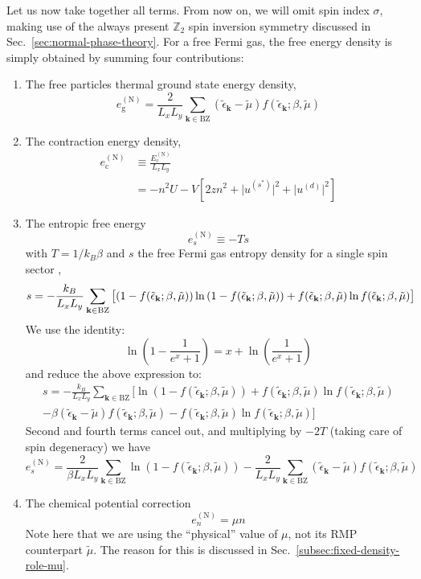 Let us now take together all terms. From now on, we will omit spin index $\sigma$, making use of the always present $\mathbb{Z}_2$ spin inversion symmetry discussed in Sec.~\ref{sec:normal-phase-theory}. For a free Fermi gas, the free energy density is simply obtained by summing four contributions:
\begin{enumerate}
	\item The free particles thermal ground state energy density,
	\[
		e_\mathrm{g}^{(\mathrm{N})} = \frac{2}{L_x L_y} \sum_{\mathbf{k}\in\mathrm{BZ}} (\tilde{\epsilon}_\mathbf{k}-\tilde{\mu}) f( \tilde{\epsilon}_\mathbf{k}; \beta,\tilde{\mu} )
	\]
	\item The contraction energy density,
	\[
	\begin{aligned}
		e_\mathrm{c}^{(\mathrm{N})} &\equiv \frac{E_\mathrm{c}^{(\mathrm{N})}}{L_x L_y} \\
		&= - n^2 U - V \left[
			2zn^2 + 
			\big|
				u^{(s^*)}
			\big|^2 + \big|
				u^{(d)}
			\big|^2
		\right]
	\end{aligned}
	\]
	\item The entropic free energy
	\[
		e_s^{(\mathrm{N})} \equiv -Ts
	\]
	with $T = 1/k_B \beta$ and $s$ the free Fermi gas entropy density for a single spin sector \cite{grosso2014solid},
	\begin{equation}\label{eq:normal-entropy-density}
		s = -\frac{k_B}{L_x L_y} \sum_{\mathbf{k}\in\mathrm{BZ}} \left[
			\left(
				1- f( \tilde{\epsilon}_\mathbf{k}; \beta,\tilde{\mu})
			\right) \ln \left(
				1- f( \tilde{\epsilon}_\mathbf{k}; \beta,\tilde{\mu})
			\right) + f(
				\tilde{\epsilon}_\mathbf{k}; \beta,\tilde{\mu})
			\ln f( \tilde{\epsilon}_\mathbf{k}; \beta,\tilde{\mu})
			\vphantom{A^A}
		\right]
	\end{equation}
	We use the identity:
	\[
		\ln \left(
			1-\frac{1}{e^x+1}
		\right) = x+\ln \left(
			\frac{1}{e^x+1}
		\right) 
	\]
	and reduce the above expression to:
	\begin{multline*}
		s = -\frac{k_B}{L_x L_y} \sum_{\mathbf{k}\in\mathrm{BZ}} \Big[ \ln \left(
		1- f( \tilde{\epsilon}_\mathbf{k}; \beta,\tilde{\mu}) \right) + f( \tilde{\epsilon}_\mathbf{k}; \beta,\tilde{\mu}) \ln f( \tilde{\epsilon}_\mathbf{k}; \beta,\tilde{\mu}) \\
		- \beta (\tilde{\epsilon}_\mathbf{k}-\tilde{\mu}) f( \tilde{\epsilon}_\mathbf{k}; \beta,\tilde{\mu}) - f( \tilde{\epsilon}_\mathbf{k}; \beta,\tilde{\mu}) \ln f( \tilde{\epsilon}_\mathbf{k}; \beta,\tilde{\mu})
		\Big]
	\end{multline*}
	Second and fourth terms cancel out, and multiplying by $-2T$ (taking care of spin degeneracy) we have
	\[
		e_s^{(\mathrm{N})} = \frac{2}{\beta L_x L_y} \sum_{\mathbf{k}\in\mathrm{BZ}} \ln \left(
		1- f( \tilde{\epsilon}_\mathbf{k}; \beta,\tilde{\mu}) \right) - \frac{2}{L_x L_y} \sum_{\mathbf{k}\in\mathrm{BZ}} (\tilde{\epsilon}_\mathbf{k}-\tilde{\mu}) f( \tilde{\epsilon}_\mathbf{k}; \beta,\tilde{\mu})
	\]
	\item The chemical potential correction
	\[
		e_n^{(\mathrm{N})} = \mu n
	\]
	Note here that we are using the ``physical'' value of $\mu$, not its RMP counterpart $\tilde{\mu}$. The reason for this is discussed in Sec.~\ref{subsec:fixed-density-role-mu}.
\end{enumerate}

